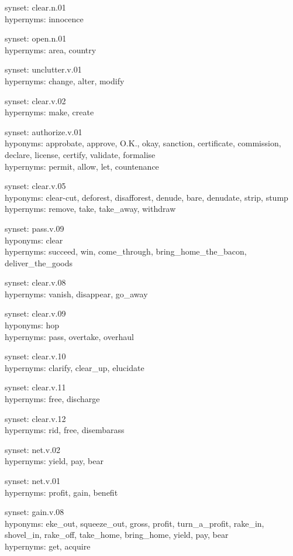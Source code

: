 {\ttfamily
synset: clear.n.01\\
hypernyms: innocence

synset: open.n.01\\
hypernyms: area, country

synset: unclutter.v.01\\
hypernyms: change, alter, modify

synset: clear.v.02\\
hypernyms: make, create

synset: authorize.v.01\\
hyponyms: approbate, approve, O.K., okay, sanction, certificate, commission, declare, license, certify, validate, formalise\\
hypernyms: permit, allow, let, countenance

synset: clear.v.05\\
hyponyms: clear-cut, deforest, disafforest, denude, bare, denudate, strip, stump\\
hypernyms: remove, take, take\_away, withdraw

synset: pass.v.09\\
hyponyms: clear\\
hypernyms: succeed, win, come\_through, bring\_home\_the\_bacon, deliver\_the\_goods

synset: clear.v.08\\
hypernyms: vanish, disappear, go\_away

synset: clear.v.09\\
hyponyms: hop\\
hypernyms: pass, overtake, overhaul

synset: clear.v.10\\
hypernyms: clarify, clear\_up, elucidate

synset: clear.v.11\\
hypernyms: free, discharge

synset: clear.v.12\\
hypernyms: rid, free, disembarass

synset: net.v.02\\
hypernyms: yield, pay, bear

synset: net.v.01\\
hypernyms: profit, gain, benefit

synset: gain.v.08\\
hyponyms: eke\_out, squeeze\_out, gross, profit, turn\_a\_profit, rake\_in, shovel\_in, rake\_off, take\_home, bring\_home, yield, pay, bear\\
hypernyms: get, acquire

}
